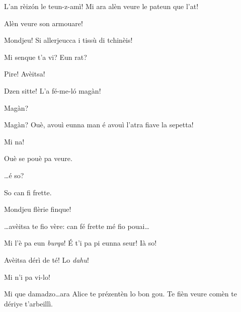 \begin{drama}
\Cheriespeaks L'an rèiz\'on le teun-z-amì! Mi ara alèn veure le pateun que l'at!

\Guillaumespeaks Alèn veure son armouare!


\Cheriespeaks Mondjeu! Si allerjeucca i tissù di tchinèis!


\Guillaumespeaks Mi senque t’a vi? Eun rat?

\Cheriespeaks Pire! Avèitsa!


\Alicespeaks Dzen sitte! L'a fé-me-l\'o magàn!

\Cheriespeaks Magàn?

\Guillaumespeaks Magàn? Ouè, avouì eunna man é avouì l’atra fiave la sepetta!


\Alicespeaks{} Mi na!

\Cheriespeaks Ouè se pouè pa veure.


\Cheriespeaks{} \ldots é so?

\Alicespeaks So can fi frette.

\Cheriespeaks{} Mondjeu flèrie finque!


\Alicespeaks \ldots avèitsa te fio vère: can fé frette mé fio pouai\ldots


\Cheriespeaks Mi l'è pa eun \textit{burqa}! \'E t'i pa pi eunna seur! Ià so!


\Guillaumespeaks{} Avèitsa dérì de té! Lo \textit{dahu}!


\Alicespeaks Mi n'i pa vi-lo!

\Cheriespeaks Mi que damadzo\ldots ara Alice te prézentèn lo bon gou. Te fièn veure comèn te dériye t'arbeillì.


\end{drama}
